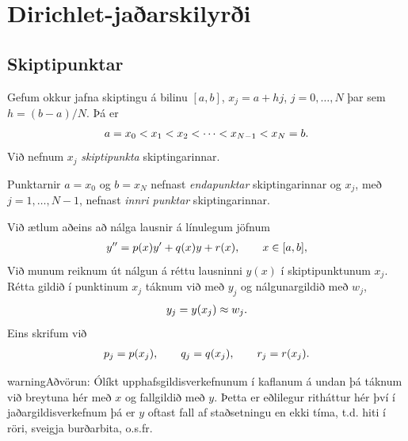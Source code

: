 \documentclass[letterpaper,10pt,icelandic]{sphinxmanual}
\begin{document}
\section{Dirichlet-jaðarskilyrði}
\label{kafli07:dirichlet-jaarskilyri}

\subsection{Skiptipunktar}
\label{kafli07:skiptipunktar}\label{kafli07:index-2}
Gefum okkur jafna skiptingu á bilinu \([a,b]\), \(x_j=a+hj\),
\(j=0,\ldots,N\) þar sem \(h=(b-a)/N\). Þá er
\begin{gather}
\begin{split}a=x_0<x_1<x_2<\cdots<x_{N-1}<x_N=b.\end{split}\notag
\end{gather}
Við nefnum \(x_j\) \emph{skiptipunkta} skiptingarinnar.

Punktarnir \(a=x_0\) og \(b=x_N\) nefnast \emph{endapunktar}
skiptingarinnar og \(x_j\), með \(j=1,\dots,N-1\), nefnast
\emph{innri punktar} skiptingarinnar.

Við ætlum aðeins að nálga lausnir á línulegum jöfnum
\begin{gather}
\begin{split}y''=p(x)y'+q(x)y+r(x), \qquad x\in [a,b],\end{split}\notag
\end{gather}
Við munum reiknum út nálgun á réttu lausninni \(y(x)\) í skiptipunktunum \(x_j\).
Rétta gildið í punktinum \(x_j\) táknum við með \(y_j\) og
nálgunargildið með \(w_j\),
\begin{gather}
\begin{split}y_j=y(x_j)\approx w_j.\end{split}\notag
\end{gather}
Eins skrifum við
\begin{gather}
\begin{split}p_j=p(x_j), \qquad q_j=q(x_j), \qquad  r_j=r(x_j).\end{split}\notag
\end{gather}
\begin{notice}{warning}{Aðvörun:}
Ólíkt upphafsgildisverkefnunum í kaflanum á undan þá táknum við breytuna
hér með \(x\) og fallgildið með \(y\). Þetta er eðlilegur ritháttur
hér því í jaðargildisverkefnum þá er \(y\) oftast fall
af staðsetningu en ekki tíma, t.d. hiti í röri, sveigja burðarbita, o.s.fr.
\end{notice}
\end{document}
